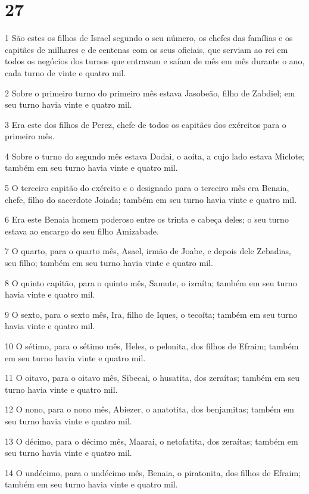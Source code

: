 \chapter{27}

\par 1 São estes os filhos de Israel segundo o seu número, os chefes das famílias e os capitães de milhares e de centenas com os seus oficiais, que serviam ao rei em todos os negócios dos turnos que entravam e saíam de mês em mês durante o ano, cada turno de vinte e quatro mil.
\par 2 Sobre o primeiro turno do primeiro mês estava Jasobeão, filho de Zabdiel; em seu turno havia vinte e quatro mil.
\par 3 Era este dos filhos de Perez, chefe de todos os capitães dos exércitos para o primeiro mês.
\par 4 Sobre o turno do segundo mês estava Dodai, o aoíta, a cujo lado estava Miclote; também em seu turno havia vinte e quatro mil.
\par 5 O terceiro capitão do exército e o designado para o terceiro mês era Benaia, chefe, filho do sacerdote Joiada; também em seu turno havia vinte e quatro mil.
\par 6 Era este Benaia homem poderoso entre os trinta e cabeça deles; o seu turno estava ao encargo do seu filho Amizabade.
\par 7 O quarto, para o quarto mês, Asael, irmão de Joabe, e depois dele Zebadias, seu filho; também em seu turno havia vinte e quatro mil.
\par 8 O quinto capitão, para o quinto mês, Samute, o izraíta; também em seu turno havia vinte e quatro mil.
\par 9 O sexto, para o sexto mês, Ira, filho de Iques, o tecoíta; também em seu turno havia vinte e quatro mil.
\par 10 O sétimo, para o sétimo mês, Heles, o pelonita, dos filhos de Efraim; também em seu turno havia vinte e quatro mil.
\par 11 O oitavo, para o oitavo mês, Sibecai, o husatita, dos zeraítas; também em seu turno havia vinte e quatro mil.
\par 12 O nono, para o nono mês, Abiezer, o anatotita, dos benjamitas; também em seu turno havia vinte e quatro mil.
\par 13 O décimo, para o décimo mês, Maarai, o netofatita, dos zeraítas; também em seu turno havia vinte e quatro mil.
\par 14 O undécimo, para o undécimo mês, Benaia, o piratonita, dos filhos de Efraim; também em seu turno havia vinte e quatro mil.

